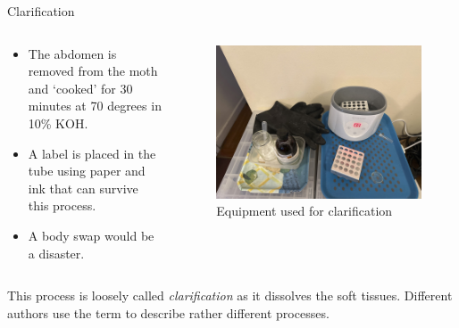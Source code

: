 \documentclass[
  ignorenonframetext,
]{beamer}
\providecommand{\tightlist}{%
  \setlength{\itemsep}{0pt}\setlength{\parskip}{0pt}}
\begin{document}
\begin{frame}{Clarification}
\protect\hypertarget{clarification}{}
\begin{columns}[T]
\begin{column}{0.5\textwidth}
\begin{itemize}
\tightlist
\item
  The abdomen is removed from the moth and `cooked' for 30 minutes at 70
  degrees in 10\% KOH.
\item
  A label is placed in the tube using paper and ink that can survive
  this process.
\item
  A body swap would be a disaster.
\end{itemize}
\end{column}

\begin{column}{0.5\textwidth}
\begin{figure}
\centering
\includegraphics{./images/clarification.jpg}
\caption{Equipment used for clarification}
\end{figure}
\end{column}
\end{columns}

This process is loosely called \emph{clarification} as it dissolves the
soft tissues. Different authors use the term to describe rather
different processes.
\end{frame}
\end{document}
